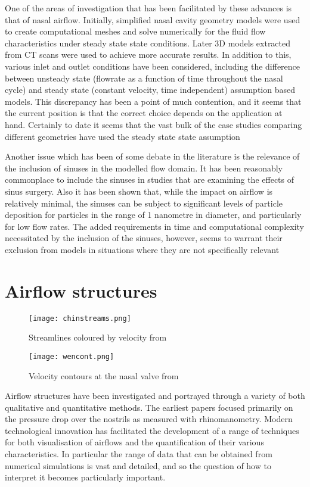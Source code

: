 One of the areas of investigation that has been facilitated by these advances is that of nasal airflow. Initially, simplified nasal cavity geometry models were used to create computational meshes and solve numerically for the fluid flow characteristics under steady state state conditions\cite{Keyhani1995, Hahn1993}. Later 3D models extracted from CT scans were used to achieve more accurate results\cite{Martonen2002}. In addition to this, various inlet and outlet conditions have been considered, including the difference between unsteady state  (flowrate as a function of time throughout the nasal cycle)\cite{Shi2006} and steady state (constant velocity, time independent) assumption based models\cite{Wen2008}. This discrepancy has been a point of much contention, and it seems that the current position is that the correct choice depends on the application at hand\cite{Doorly2008c}. Certainly to date it seems that the vast bulk of the case studies comparing different geometries have used the steady state state assumption\cite{Xi2012, Zhu2011, Garcia2007}

Another issue which has been of some debate in the literature is the relevance of the inclusion of sinuses in the modelled flow domain. It has been reasonably commonplace to include the sinuses in studies that are examining the effects of sinus surgery\cite{Xiong2008a, Lindemann2005}. Also it has been shown that, while the impact on airflow is relatively minimal, the sinuses can be subject to significant levels of particle deposition for particles in the range of 1 nanometre in diameter, and particularly for low flow rates\cite{Ge2012}. The added requirements in time and computational complexity necessitated by the inclusion of the sinuses, however, seems to warrant their exclusion from models in situations where they are not specifically relevant\cite{Doorly2008c}


\section{Airflow structures}

\begin{figure}
  \texttt{[image: chinstreams.png]}
  \caption{Streamlines coloured by velocity from \cite{Tan2012}} \label{fig:chinstreams}
\centering
\end{figure}

\begin{figure}
  \texttt{[image: wencont.png]}
  \caption{Velocity contours at the nasal valve from \cite{Wen2008}} \label{fig:wencont}
\centering
\end{figure}
Airflow structures have been investigated and portrayed through a variety of both qualitative and quantitative methods. The earliest papers focused primarily on the pressure drop over the nostrils as measured with rhinomanometry\cite{Martin1981}. Modern technological innovation has facilitated the development of a range of techniques for both visualisation of airflows and the quantification of their various characteristics. In particular the range of data that can be obtained from numerical simulations is vast and detailed, and so the question of how to interpret it becomes particularly important.

